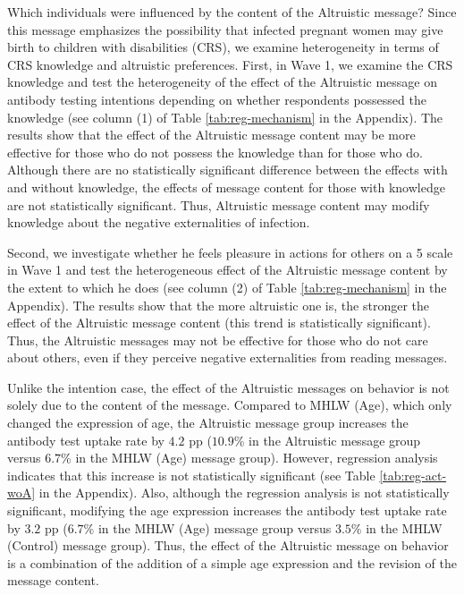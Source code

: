 \documentclass[
]{article}
\begin{document}
Which individuals were influenced by the content of the Altruistic message? Since this message emphasizes the possibility that infected pregnant women may give birth to children with disabilities (CRS), we examine heterogeneity in terms of CRS knowledge and altruistic preferences. First, in Wave 1, we examine the CRS knowledge and test the heterogeneity of the effect of the Altruistic message on antibody testing intentions depending on whether respondents possessed the knowledge (see column (1) of Table \ref{tab:reg-mechanism} in the Appendix). The results show that the effect of the Altruistic message content may be more effective for those who do not possess the knowledge than for those who do. Although there are no statistically significant difference between the effects with and without knowledge, the effects of message content for those with knowledge are not statistically significant. Thus, Altruistic message content may modify knowledge about the negative externalities of infection.

Second, we investigate whether he feels pleasure in actions for others on a 5 scale in Wave 1 and test the heterogeneous effect of the Altruistic message content by the extent to which he does (see column (2) of Table \ref{tab:reg-mechanism} in the Appendix). The results show that the more altruistic one is, the stronger the effect of the Altruistic message content (this trend is statistically significant). Thus, the Altruistic messages may not be effective for those who do not care about others, even if they perceive negative externalities from reading messages.

Unlike the intention case, the effect of the Altruistic messages on behavior is not solely due to the content of the message. Compared to MHLW (Age), which only changed the expression of age, the Altruistic message group increases the antibody test uptake rate by \(4.2\) pp (\(10.9\)\% in the Altruistic message group versus \(6.7\)\% in the MHLW (Age) message group). However, regression analysis indicates that this increase is not statistically significant (see Table \ref{tab:reg-act-woA} in the Appendix). Also, although the regression analysis is not statistically significant, modifying the age expression increases the antibody test uptake rate by \(3.2\) pp (\(6.7\)\% in the MHLW (Age) message group versus \(3.5\)\% in the MHLW (Control) message group). Thus, the effect of the Altruistic message on behavior is a combination of the addition of a simple age expression and the revision of the message content.
\end{document}
